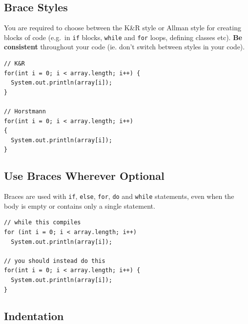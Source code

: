 \documentclass[10pt,DIV=23,landscape]{scrartcl}
\begin{document}
\subsection{Brace Styles}\label{brace-styles}

\begin{paracol}{2}
\begin{leftcolumn}
You are required to choose between the K\&R style or Allman style for
creating blocks of code (e.g.~in \lstinline{if} blocks, \lstinline{while} and
\lstinline{for} loops, defining classes etc). \textbf{Be consistent}
throughout your code (ie. don't switch between styles in your code).
\end{leftcolumn}

\begin{rightcolumn}
\begin{lstlisting}
// K&R
for(int i = 0; i < array.length; i++) {
  System.out.println(array[i]);
}

// Horstmann
for(int i = 0; i < array.length; i++)
{
  System.out.println(array[i]);
}
\end{lstlisting}
\end{rightcolumn}
\end{paracol}

\subsection{Use Braces Wherever
Optional}\label{use-braces-wherever-optional}

\begin{paracol}{2}
\begin{leftcolumn}
Braces are used with \lstinline{if}, \lstinline{else}, \lstinline{for},
\lstinline{do} and \lstinline{while} statements, even when the body is empty
or contains only a single statement.
\end{leftcolumn}

\begin{rightcolumn}
\begin{lstlisting}
// while this compiles
for (int i = 0; i < array.length; i++)
  System.out.println(array[i]);

// you should instead do this
for(int i = 0; i < array.length; i++) {
  System.out.println(array[i]);
}
\end{lstlisting}
\end{rightcolumn}
\end{paracol}

\subsection{Indentation}\label{indentation}
\end{document}
